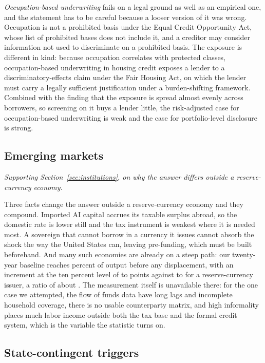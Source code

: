 \emph{Occupation-based underwriting} fails on a legal ground as well as an empirical one, and the
statement has to be careful because a looser version of it was wrong. Occupation is not a
prohibited basis under the Equal Credit Opportunity Act, whose list of prohibited bases does not
include it, and a creditor may consider information not used to discriminate on a prohibited
basis. The exposure is different in kind: because occupation correlates with protected classes,
occupation-based underwriting in housing credit exposes a lender to a discriminatory-effects claim
under the Fair Housing Act, on which the lender must carry a legally sufficient justification
under a burden-shifting framework. Combined with the finding that the exposure is spread almost
evenly across borrowers, so screening on it buys a lender little, the risk-adjusted case for
occupation-based underwriting is weak and the case for portfolio-level disclosure is strong.

\subsection{Emerging markets}

\emph{Supporting Section~\ref{sec:institutions}, on why the answer differs outside a reserve-currency economy.}

Three facts change the answer outside a reserve-currency economy and they compound. Imported AI
capital accrues its taxable surplus abroad, so the domestic rate is lower still and the tax
instrument is weakest where it is needed most. A sovereign that cannot borrow in a currency it
issues cannot absorb the shock the way the United States can, leaving pre-funding, which must be
built beforehand. And many such economies are already on a steep path: our twenty-year baseline
reaches  percent of output before any displacement, with an increment at the
ten percent level of  to  points against
 to  for a reserve-currency issuer, a
ratio of about . The measurement itself is unavailable there: for the one case we
attempted, the flow of funds data have long lags and incomplete household coverage, there is no
usable counterparty matrix, and high informality places much labor income outside both the tax
base and the formal credit system, which is the variable the statistic turns on.

\subsection{State-contingent triggers}

